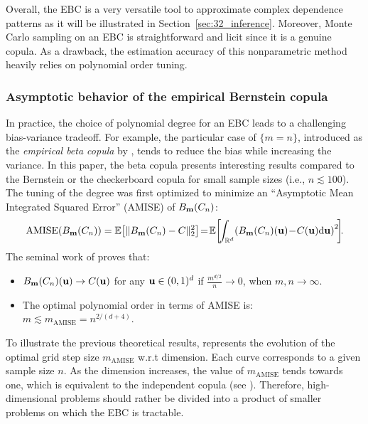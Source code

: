 Overall, the EBC is a very versatile tool to approximate complex dependence patterns as it will be illustrated in Section~\ref{sec:32_inference}. 
Moreover, Monte Carlo sampling on an EBC is straightforward and licit since it is a genuine copula. 
As a drawback, the estimation accuracy of this nonparametric method heavily relies on polynomial order tuning.   


\subsubsection{Asymptotic behavior of the empirical Bernstein copula}
In practice, the choice of polynomial degree for an EBC leads to a challenging bias-variance tradeoff. 
For example, the particular case of $\{m = n\}$, introduced as the \textit{empirical beta copula} by \cite{segers_2017}, tends to reduce the bias while increasing the variance. 
In this paper, the beta copula presents interesting results compared to the Bernstein or the checkerboard copula for small sample sizes (i.e., $n\lesssim100$). 
The tuning of the degree was first optimized to minimize an ``Asymptotic Mean Integrated Squared Error'' (AMISE) of $B_{{\bf m}}(C_n)$: 
\begin{equation}
    \mathrm{AMISE}(B_{\bm}(C_n)) = \E\!\left[ \lVert B_{\bm}(C_n) - C \rVert^2_2 \right] \!=\! \E\!\left[\!\int_{\R^d}\! \left(B_{\bm}(C_n)(\bu) \!-\! C(\bu) \dd \bu \right)^2 \!\right]\!\!.
    \label{eq:aimse}
\end{equation}
The seminal work of \citet[Theorem 3]{sancetta_satchell_2004} proves that: 
\begin{itemize}
    \item $B_{{\bf m}}(C_n)({\bf u}) \rightarrow C({\bf u})$ for any ${\bf u} \in (0, 1)^d$ if $\frac{m^{d/2}}{n} \rightarrow 0$, when $m, n \rightarrow \infty$.
    \item The optimal polynomial order in terms of AMISE is\footnotemark: $m \lesssim m_{\mathrm{AMISE}} = n^{2/(d+4)}$.    
\end{itemize}
To illustrate the previous theoretical results,  represents the evolution of the optimal grid step size $m_{\mathrm{AMISE}}$ w.r.t dimension. 
Each curve corresponds to a given sample size $n$. 
As the dimension increases, the value of $m_{\mathrm{AMISE}}$ tends towards one, which is equivalent to the independent copula (see \citealp[p. 117]{lasserre_2022}). 
Therefore, high-dimensional problems should rather be divided into a product of smaller problems on which the EBC is tractable.

